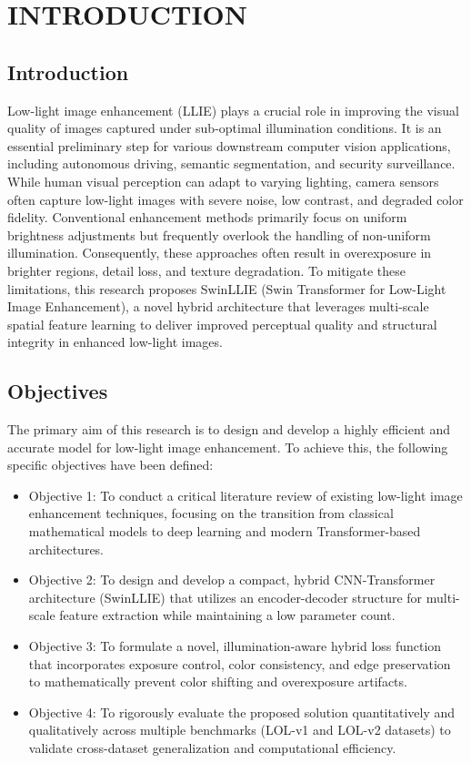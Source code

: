\documentclass[12pt, a4paper]{report}
\begin{document}
\clearpage
{}
\setcounter{page}{1}

\chapter{INTRODUCTION}
\section{Introduction}
Low-light image enhancement (LLIE) plays a crucial role in improving the visual quality of images captured under sub-optimal illumination conditions. It is an essential preliminary step for various downstream computer vision applications, including autonomous driving, semantic segmentation, and security surveillance. While human visual perception can adapt to varying lighting, camera sensors often capture low-light images with severe noise, low contrast, and degraded color fidelity. Conventional enhancement methods primarily focus on uniform brightness adjustments but frequently overlook the handling of non-uniform illumination. Consequently, these approaches often result in overexposure in brighter regions, detail loss, and texture degradation. To mitigate these limitations, this research proposes SwinLLIE (Swin Transformer for Low-Light Image Enhancement), a novel hybrid architecture that leverages multi-scale spatial feature learning to deliver improved perceptual quality and structural integrity in enhanced low-light images.

\section{Objectives}
The primary aim of this research is to design and develop a highly efficient and accurate model for low-light image enhancement. To achieve this, the following specific objectives have been defined:
\begin{itemize}
    \item Objective 1: To conduct a critical literature review of existing low-light image enhancement techniques, focusing on the transition from classical mathematical models to deep learning and modern Transformer-based architectures.
    \item Objective 2: To design and develop a compact, hybrid CNN-Transformer architecture (SwinLLIE) that utilizes an encoder-decoder structure for multi-scale feature extraction while maintaining a low parameter count.
    \item Objective 3: To formulate a novel, illumination-aware hybrid loss function that incorporates exposure control, color consistency, and edge preservation to mathematically prevent color shifting and overexposure artifacts.
    \item Objective 4: To rigorously evaluate the proposed solution quantitatively and qualitatively across multiple benchmarks (LOL-v1 and LOL-v2 datasets) to validate cross-dataset generalization and computational efficiency.
\end{itemize}
\end{document}
